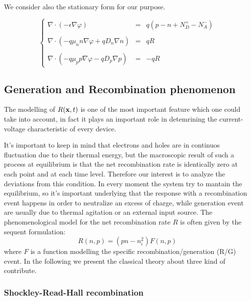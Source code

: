 We consider also the stationary form for our purpose.

\begin{equation}
\label{eq: stationary problem}
\left\{
\begin{array}{rcl}
\nabla \cdot (-\epsilon \nabla \varphi) & = & q(p-n+N_D^+-N_A^-) \\ \\
\nabla \cdot ( - q\mu_n n \nabla \varphi + qD_n \nabla n )& = & qR \\ \\
\nabla \cdot (- q\mu_p p \nabla \varphi - qD_p \nabla p )& = & -qR
\end{array}
\right.
\end{equation}

\subsection{Generation and Recombination phenomenon}
\label{subsection: RG}

The modelling of $R(\mathbf{x},t)$ is one of the most important feature which one could take into account, in fact it plays an important role in detemrining the current-voltage characteristic of every device.
 
It's important to keep in mind that electrons and holes are in continuos fluctuation due to their thermal energy, but the macroscopic result of such a process at equilibrium is that the net recombination rate is identically zero at each point and at each time level. Therefore our interest is to analyze the deviations from this condition. In every moment the system try to mantain the equilibrium, so it's important underlying that the response with a recombination event happens in order to neutralize an excess of charge, while generation event are usually due to thermal agitation or an external input source.
The phenomenological model for the net recombination rate $R$ is often given by the sequent formulation:
\begin{equation}
\label{eq: generic RG}
R(n,p) = (pn-n_i^2)F(n,p)
\end{equation}
where $F$ is a function modelling the specific recombination/generation (R/G) event.
In the following we present the classical theory about three kind of contribute. 

\subsubsection{Shockley-Read-Hall recombination}

